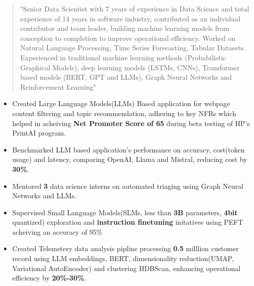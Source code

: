\documentclass[10pt,a4paper,ragged2e,withhyper]{altacv}
\author{Gaurav Sood}
\date{\today}
\title{}
\begin{document}

\makecvheader

\begin{paracol}{1}
 \begin{quote}
"Senior Data Scientist with 7 years of experience in Data Science and total experience of 14 years in software industry, contributed as an individual contributor and team leader, building machine learning models from conception to completion to improve operational efficiency. Worked on  Natural Language Processing, Time Series Forecasting, Tabular Datasets. Experienced in traditional machine learning methods (Probabilistic Graphical Models), deep learning models (LSTMs, CNNs), Transformer based models (BERT, GPT and LLMs), Graph Neural Networks and Reinforcement Learning"
 \end{quote}
\label{sec:org662dcfa}


\divider

\divider


\label{sec:org2acc8d9}

\begin{itemize}
\item Created Large Language Models(LLMs) Based application for webpage content
filtering and topic recommendation, adhering to key NFRs which helped in
acheiving \textbf{\textbf{Net Promoter Score of 65}} during beta testing of HP's PrintAI
program.
\item Benchmarked LLM based application's performance on accuracy, cost(token usage)
and latency, comparing OpenAI, Llama and Mistral, reducing cost by \textbf{\textbf{30\%}}.
\item Mentored \textbf{\textbf{3}} data science interns on automated triaging using Graph Neural
Networks and LLMs.
\item Supervised Small Language Models(SLMs, less than \textbf{\textbf{3B}} parameters, \textbf{\textbf{4bit}}
quantized) exploration and \textbf{\textbf{instruction finetuning}}
initatives using PEFT acheiving an accuracy of 95\%
\item Created Telemetery data analysis pipline processing \textbf{\textbf{0.5}} milllion customer
record using LLM embeddings, BERT, dimensionality reduction(UMAP, Variational
AutoEncoder) and clustering HDBScan, enhancing operational efficiency by \textbf{\textbf{20\%-30\%}}.
\end{itemize}


\end{paracol}
\end{document}
